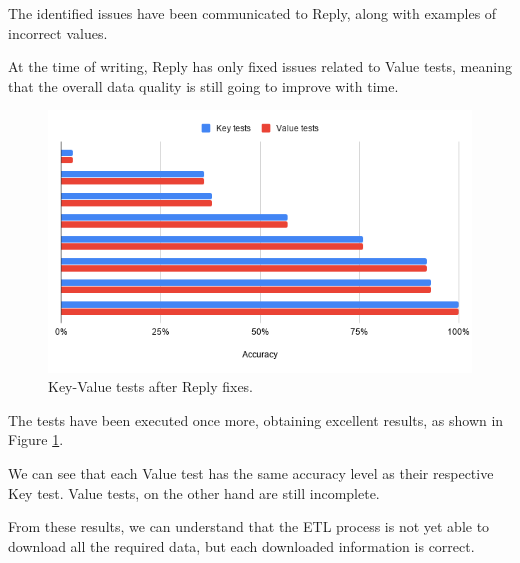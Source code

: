 The identified issues have been communicated to Reply, along with examples of incorrect values.

At the time of writing, Reply has only fixed issues related to Value tests, meaning that the overall data quality is still going to improve with time.

\begin{figure}
    \centering
    \includegraphics[width=\textwidth]{res/tests/data_val_2.png}
    \caption{Key-Value tests after Reply fixes.}
    \label{fig:tests:data:results_3}
\end{figure}

The tests have been executed once more, obtaining excellent results, as shown in Figure \ref{fig:tests:data:results_3}.

We can see that each Value test has the same accuracy level as their respective Key test.
Value tests, on the other hand are still incomplete.

From these results, we can understand that the ETL process is not yet able to download all the required data, but each downloaded information is correct.
